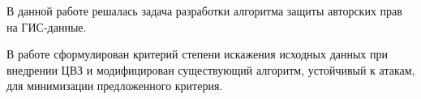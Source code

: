 \newpage

\startconclusionpage

В данной работе решалась задача разработки алгоритма защиты авторских прав на ГИС-данные.

В работе сформулирован критерий степени искажения исходных данных при внедрении ЦВЗ и модифицирован существующий алгоритм, устойчивый к атакам, 
для минимизации предложенного критерия.

